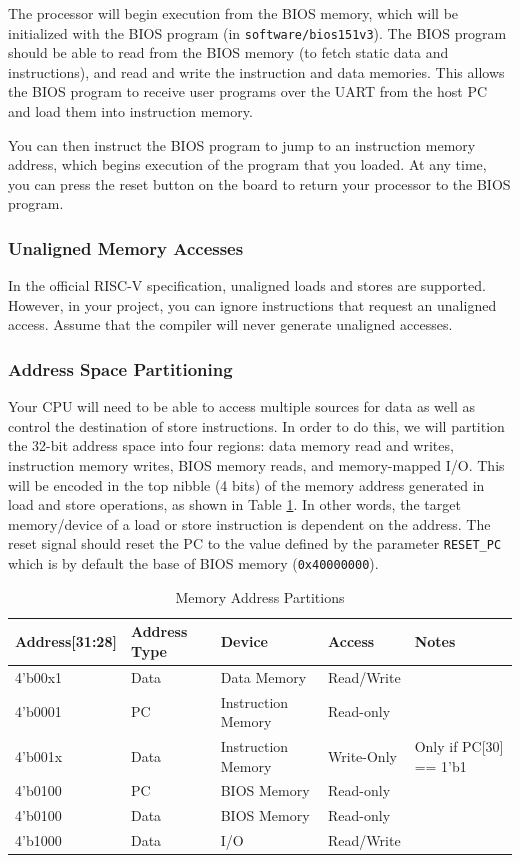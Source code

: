 \documentclass[11pt]{article}
\begin{document}
The processor will begin execution from the BIOS memory, which will be initialized with the BIOS program (in \verb|software/bios151v3|).
The BIOS program should be able to read from the BIOS memory (to fetch static data and instructions), and read and write the instruction and data memories.
This allows the BIOS program to receive user programs over the UART from the host PC and load them into instruction memory.

You can then instruct the BIOS program to jump to an instruction memory address, which begins execution of the program that you loaded.
At any time, you can press the reset button on the board to return your processor to the BIOS program.

\subsubsection{Unaligned Memory Accesses}
In the official RISC-V specification, unaligned loads and stores are supported.
However, in your project, you can ignore instructions that request an unaligned access.
Assume that the compiler will never generate unaligned accesses.

\subsubsection{Address Space Partitioning}
Your CPU will need to be able to access multiple sources for data as well as control the destination of store instructions.
In order to do this, we will partition the 32-bit address space into four regions: data memory read and writes, instruction memory writes, BIOS memory reads, and memory-mapped I/O.
This will be encoded in the top nibble (4 bits) of the memory address generated in load and store operations, as shown in Table \ref{mem_space1}.
In other words, the target memory/device of a load or store instruction is dependent on the address.
The reset signal should reset the PC to the value defined by the parameter \verb|RESET_PC| which is by default the base of BIOS memory (\verb|0x40000000|).

\begin{table}[hbt]
  \begin{center}
    \caption{Memory Address Partitions}
    \label{mem_space1}
    \begin{tabular}{l l l l l}
      \bottomrule
      \textbf{Address[31:28]} & \textbf{Address Type} & \textbf{Device} & \textbf{Access} & \textbf{Notes} \\
      \midrule
      4'b00x1 & Data & Data Memory & Read/Write &\\
      4'b0001 & PC  &  Instruction Memory & Read-only &\\
      4'b001x & Data & Instruction Memory & Write-Only & Only if PC[30] == 1'b1\\
      4'b0100 & PC  & BIOS Memory & Read-only &\\
      4'b0100 & Data & BIOS Memory & Read-only &\\
      4'b1000 & Data & I/O & Read/Write &\\
      \bottomrule
    \end{tabular}
  \end{center}
\end{table}
\end{document}
